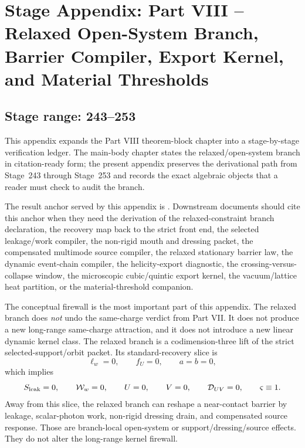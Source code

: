\chapter{Stage Appendix: Part VIII -- Relaxed Open-System Branch, Barrier Compiler, Export Kernel, and Material Thresholds}
\label{app:stage-part-8}

\section*{Stage range: 243--253}

This appendix expands the Part VIII theorem-block chapter into a stage-by-stage verification ledger.  The main-body chapter states the relaxed/open-system branch in citation-ready form; the present appendix preserves the derivational path from Stage~243 through Stage~253 and records the exact algebraic objects that a reader must check to audit the branch.

The result anchor served by this appendix is .  Downstream documents should cite this anchor when they need the derivation of the relaxed-constraint branch declaration, the recovery map back to the strict front end, the selected leakage/work compiler, the non-rigid mouth and dressing packet, the compensated multimode source compiler, the relaxed stationary barrier law, the dynamic event-chain compiler, the helicity-export diagnostic, the crossing-versus-collapse window, the microscopic cubic/quintic export kernel, the vacuum/lattice heat partition, or the material-threshold companion.

The conceptual firewall is the most important part of this appendix.  The relaxed branch does \emph{not} undo the same-charge verdict from Part VII.  It does not produce a new long-range same-charge attraction, and it does not introduce a new linear dynamic kernel class.  The relaxed branch is a codimension-three lift of the strict selected-support/orbit packet.  Its standard-recovery slice is
\begin{equation}
\label{eq:app-part08-intro-recovery-slice}
\ell_w=0,
\qquad
f_U=0,
\qquad
a=b=0,
\end{equation}
which implies
\begin{equation}
\label{eq:app-part08-intro-recovery-observables}
S_{\rm leak}=0,
\qquad
\mathcal W_w=0,
\qquad
U=0,
\qquad
V=0,
\qquad
\mathcal D_{UV}=0,
\qquad
\varsigma\equiv 1.
\end{equation}
Away from this slice, the relaxed branch can reshape a near-contact barrier by leakage, scalar-photon work, non-rigid dressing drain, and compensated source response.  Those are branch-local open-system or support/dressing/source effects.  They do not alter the long-range kernel firewall.

